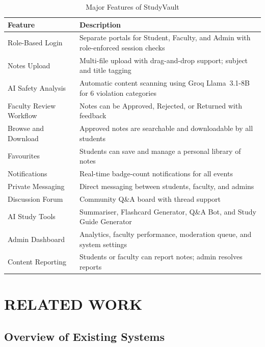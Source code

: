 \documentclass{sgcproject}
\begin{document}
\begin{table}[H]
\centering
\begin{tabular}{|p{4cm}|p{10cm}|}
\hline
\textbf{Feature} & \textbf{Description} \\
\hline
Role-Based Login & Separate portals for Student, Faculty, and Admin with role-enforced session checks \\
\hline
Notes Upload & Multi-file upload with drag-and-drop support; subject and title tagging \\
\hline
AI Safety Analysis & Automatic content scanning using Groq Llama~3.1-8B for 6 violation categories \\
\hline
Faculty Review Workflow & Notes can be Approved, Rejected, or Returned with feedback \\
\hline
Browse and Download & Approved notes are searchable and downloadable by all students \\
\hline
Favourites & Students can save and manage a personal library of notes \\
\hline
Notifications & Real-time badge-count notifications for all events \\
\hline
Private Messaging & Direct messaging between students, faculty, and admins \\
\hline
Discussion Forum & Community Q\&A board with thread support \\
\hline
AI Study Tools & Summariser, Flashcard Generator, Q\&A Bot, and Study Guide Generator \\
\hline
Admin Dashboard & Analytics, faculty performance, moderation queue, and system settings \\
\hline
Content Reporting & Students or faculty can report notes; admin resolves reports \\
\hline
\end{tabular}
\caption{Major Features of StudyVault}
\end{table}

\chapter{RELATED WORK}

\section{Overview of Existing Systems}
\end{document}
